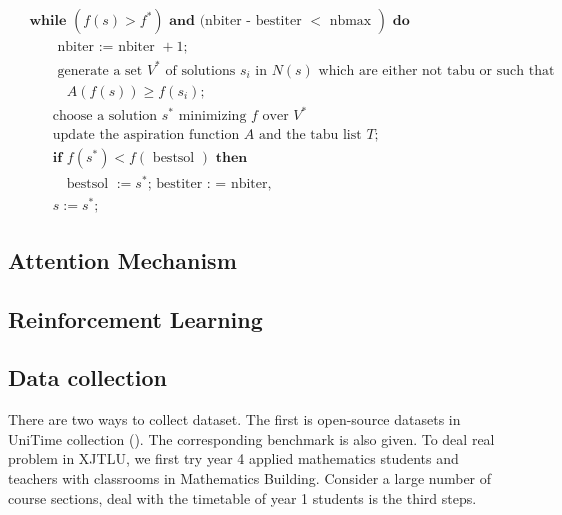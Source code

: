 \documentclass{article}
\begin{document}
\begin{align*}
	 & \textbf { while } \left.\left(f(s)>f^{*}\right) \textbf { and} \text{ (nbiter - bestiter }<\text { nbmax }\right) \textbf { do }             \\
	 & \qquad \text { nbiter := nbiter }+1 \text {; }                                                                                               \\
	 & \qquad\text { generate a set } V^{*} \text { of solutions } s_{i} \text { in } N(s) \text { which are either }\text {not tabu or such that } \\
	 & \qquad \quad A(f(s)) \geq f\left(s_{i}\right) \text {; }                                                                                     \\
	 & \qquad \text {choose a solution } s^{*} \text { minimizing } f \text { over } V^{*}                                                          \\
	 & \qquad \text {update the aspiration function } A \text { and the tabu list } T \text {; }                                                    \\
	 & \qquad \textbf {if } f\left(s^{*}\right)<f(\text { bestsol }) \textbf { then }                                                               \\
	 & \qquad \quad \text {bestsol }:=s^{*} \text {; bestiter : = nbiter, }                                                                         \\
	 & \qquad s:=s^{*} \text {; }
\end{align*}

\subsection{Attention Mechanism}

\subsection{Reinforcement Learning}

\subsection{Data collection}

There are two ways to collect dataset. The first is open-source datasets in UniTime collection (). The corresponding benchmark is also given. To deal real problem in XJTLU, we first try year 4 applied mathematics students and teachers with classrooms in Mathematics Building. Consider a large number of course sections, deal with the timetable of year 1 students is the third steps.
\end{document}

